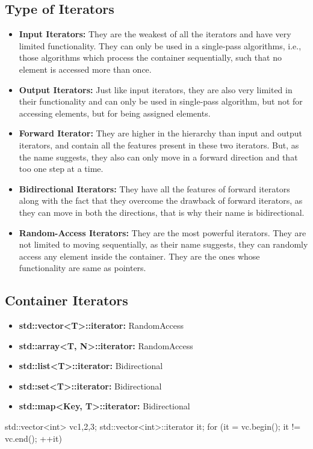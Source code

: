 \documentclass{report}
\begin{document}
\begin{concept}
    \subsection{Type of Iterators}
    \bigbreak \noindent 
    \begin{itemize}
        \item \textbf{Input Iterators:} They are the weakest of all the iterators and have very limited functionality. They can only be used in a single-pass algorithms, i.e., those algorithms which process the container sequentially, such that no element is accessed more than once.
        \item \textbf{Output Iterators:} Just like input iterators, they are also very limited in their functionality and can only be used in single-pass algorithm, but not for accessing elements, but for being assigned elements.
        \item \textbf{Forward Iterator:} They are higher in the hierarchy than input and output iterators, and contain all the features present in these two iterators. But, as the name suggests, they also can only move in a forward direction and that too one step at a time.
        \item \textbf{Bidirectional Iterators:} They have all the features of forward iterators along with the fact that they overcome the drawback of forward iterators, as they can move in both the directions, that is why their name is bidirectional.
        \item \textbf{Random-Access Iterators:} They are the most powerful iterators. They are not limited to moving sequentially, as their name suggests, they can randomly access any element inside the container. They are the ones whose functionality are same as pointers.
    \end{itemize}
    \smallbreak \noindent
    \begin{figure}[ht]
        \centering
        \label{fig:it2}
    \end{figure}

    \pagebreak
    \subsection{Container Iterators}
    \begin{itemize}
        \item \textbf{std::vector<T>::iterator:} RandomAccess
        \item \textbf{std::array<T, N>::iterator:} RandomAccess
        \item \textbf{std::list<T>::iterator:} Bidirectional  
        \item \textbf{std::set<T>::iterator:} Bidirectional
        \item \textbf{std::map<Key, T>::iterator:} Bidirectional
    \end{itemize}
    \bigbreak \noindent 
    \begin{cppcode}
        std::vector<int> vc{1,2,3};
        std::vector<int>::iterator it;
        for (it = vc.begin(); it != vc.end(); ++it)
    \end{cppcode}



\end{concept}
\end{document}

